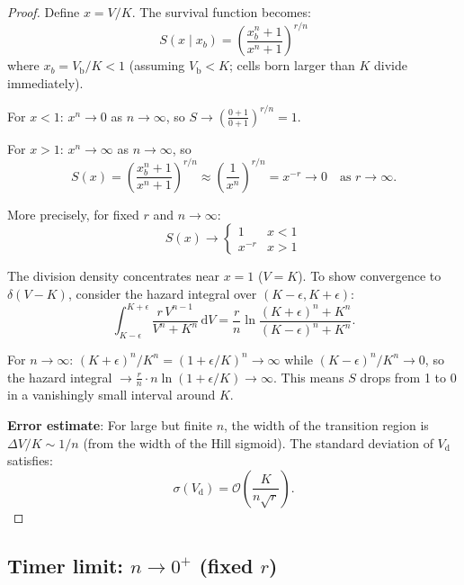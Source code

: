 \documentclass[11pt]{article}
\newcommand{\Vb}{V_{\mathrm{b}}}
\newcommand{\Vd}{V_{\mathrm{d}}}
\newcommand{\dd}{\mathrm{d}}
\newcommand{\Order}{\mathcal{O}}
\begin{document}
\begin{proof}
Define $x = V/K$. The survival function becomes:
\begin{equation}
  S(x \mid x_b) = \left(\frac{x_b^n + 1}{x^n + 1}\right)^{r/n}
\end{equation}
where $x_b = \Vb/K < 1$ (assuming $\Vb < K$; cells born larger than $K$ divide immediately).

For $x < 1$: $x^n \to 0$ as $n \to \infty$, so $S \to \left(\frac{0+1}{0+1}\right)^{r/n} = 1$.

For $x > 1$: $x^n \to \infty$ as $n \to \infty$, so
\begin{equation}
  S(x) = \left(\frac{x_b^n + 1}{x^n + 1}\right)^{r/n} \approx \left(\frac{1}{x^n}\right)^{r/n} = x^{-r} \to 0 \quad \text{as } r \to \infty.
\end{equation}

More precisely, for fixed $r$ and $n \to \infty$:
\begin{equation}
  S(x) \to \begin{cases} 1 & x < 1 \\ x^{-r} & x > 1 \end{cases}
\end{equation}

The division density concentrates near $x = 1$ ($V = K$). To show convergence to $\delta(V-K)$, consider the hazard integral over $(K-\epsilon, K+\epsilon)$:
\begin{equation}
  \int_{K-\epsilon}^{K+\epsilon} \frac{r\, V^{n-1}}{V^n + K^n}\, \dd V
  = \frac{r}{n}\ln\frac{(K+\epsilon)^n + K^n}{(K-\epsilon)^n + K^n}.
\end{equation}

For $n \to \infty$: $(K+\epsilon)^n/K^n = (1+\epsilon/K)^n \to \infty$ while $(K-\epsilon)^n/K^n \to 0$, so the hazard integral $\to \frac{r}{n}\cdot n\ln(1+\epsilon/K) \to \infty$. This means $S$ drops from 1 to 0 in a vanishingly small interval around $K$.

\textbf{Error estimate}: For large but finite $n$, the width of the transition region is $\Delta V/K \sim 1/n$ (from the width of the Hill sigmoid). The standard deviation of $\Vd$ satisfies:
\begin{equation}
  \sigma(\Vd) = \Order\!\left(\frac{K}{n\sqrt{r}}\right).
\end{equation}
\end{proof}

\subsection{Timer limit: $n \to 0^+$ (fixed $r$)}
\end{document}
